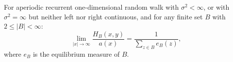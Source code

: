 For aperiodic recurrent one-dimensional random walk with \(\sigma^2 < \infty\), or with \(\sigma^2 = \infty\) but neither left nor right continuous, and for any finite set \(B\) with \(2 \leq |B| < \infty\):
\[
\lim_{|x| \to \infty} \frac{H_B(x,y)}{a(x)} = \frac{1}{\sum_{z \in B} e_B(z)},
\]
where \(e_B\) is the equilibrium measure of \(B\).
